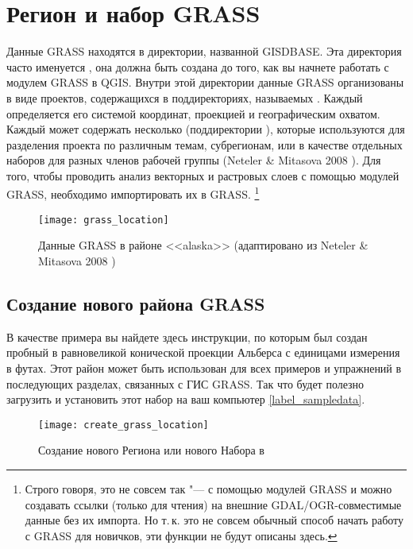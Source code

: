 \section{Регион и набор GRASS}\label{sec:about_loc}

Данные GRASS находятся в директории, названной GISDBASE. Эта директория
часто именуется , она должна быть создана до того,
как вы начнете работать с модулем GRASS в QGIS. Внутри этой директории
данные GRASS организованы в виде проектов, содержащихся в поддиректориях,
называемых . Каждый  определяется
его системой координат, проекцией и географическим охватом. Каждый
 может содержать несколько 
(поддиректории ), которые используются для разделения
проекта по различным темам, субрегионам, или в качестве отдельных
наборов для разных членов рабочей группы (Neteler \& Mitasova 2008
\cite{neteler_mitasova08}). Для того, чтобы проводить анализ векторных
и растровых слоев с помощью модулей GRASS, необходимо импортировать их
в  GRASS.
\footnote{Строго говоря, это не совсем так "--- с помощью модулей GRASS
 и  можно создавать ссылки
(только для чтения) на внешние GDAL/OGR-совместимые данные без их
импорта. Но т.\,к. это не совсем обычный способ начать работу с GRASS
для новичков, эти функции не будут описаны здесь.}


\begin{figure}[ht]
\centering
\texttt{[image: grass\_location]}
\caption{Данные GRASS в районе <<alaska>> (адаптировано из Neteler \& Mitasova 2008 \cite{neteler_mitasova08})}\label{fig:grass_location}\end{figure}

\subsection{Создание нового района GRASS}\label{sec:create_loc}

В качестве примера вы найдете здесь инструкции, по которым был создан
пробный  в равновеликой конической проекции
Альберса с единицами измерения в футах. Этот район может быть использован
для всех примеров и упражнений в последующих разделах, связанных с ГИС
GRASS. Так что будет полезно загрузить и установить этот набор на ваш
компьютер \ref{label_sampledata}.

\begin{figure}[ht]
\centering
\texttt{[image: create\_grass\_location]}
\caption{Создание нового \grass Региона или нового Набора в \qg \nixcaption}
\label{fig:create_grass_location}
\end{figure}

